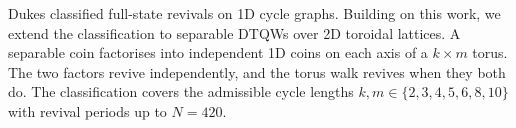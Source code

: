 Dukes \cite{Dukes2014} classified full-state revivals on 1D cycle
graphs. Building on this work, we extend the classification to
separable DTQWs over 2D toroidal lattices. A
separable coin factorises into independent 1D coins on each axis of a
$k \times m$ torus. The two factors revive independently, and the
torus walk revives when they both do. The classification covers the admissible 
cycle lengths $k, m \in \{2, 3, 4, 5, 6, 8, 10\}$ with revival periods up
to $N = 420$.
